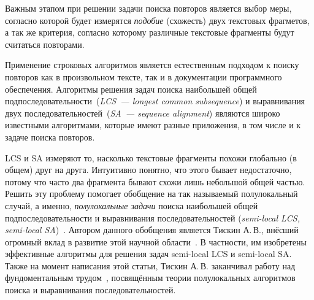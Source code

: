 Важным этапом при решении задачи поиска повторов является выбор
меры, согласно которой будет измерятся \emph{подобие} (схожесть) двух текстовых фрагметов, а так же критерия, согласно которому различные текстовые фрагменты будут считаться повторами.


Применение строковых алгоритмов является %
естественным подходом к поиску повторов как в произвольном тексте, так и в документации программного обеспечения.
Алгоритмы решения задач поиска наибольшей общей подпоследовательности~(\emph{LCS~--- longest common subsequence}) и выравнивания двух последовательностей~(\emph{SA~--- sequence alignment}) являются широко известными алгоритмами, которые имеют разные приложения, в том числе и к задаче поиска повторов.

LCS и SA измеряют то, насколько текстовые фрагменты похожи глобально (в общем) друг на друга. 
Интуитивно понятно, что этого бывает недостаточно, потому что часто два фрагмента бывают схожи лишь небольшой общей частью.
Решить эту проблему помогает обобщение на так называемый полулокальный случай, а именно, \emph{полулокальные задачи} поиска наибольшей общей подпоследовательности и выравнивания последовательностей (\emph{semi-local LCS, semi-local SA})~\cite{tiskin2006all}.
Автором данного обобщения является Тискин А.\,В., внёсший огромный вклад в развитие этой научной области~\cite{tiskin2015fast,tiskin2019bounded,krusche2009parallel,tiskin2006longest,tiskin2008semi,tiskin2011towards}.
В частности, им изобретены эффективные алгоритмы для решения задач semi-local LCS и semi-local SA.
Также на момент написания этой статьи, Тискин А.\,В. заканчивал работу над фундоментальным трудом~\cite{tiskin2006all}, посвящённым теории полулокальных алгоритмов поиска и выравнивания последовательностей.


